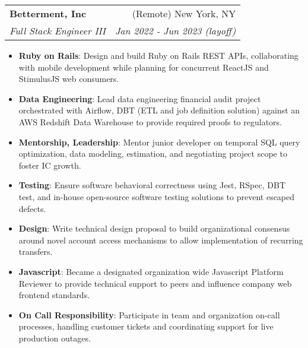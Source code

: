 \documentclass[letterpaper,11pt]{article}
\makeatletter
\newcommand{\resumeItem}[2]{
  \item\small{
    \textbf{#1}{: #2 \vspace{-2pt}}
  }
}
\newcommand{\resumeSubheading}[4]{
  \vspace{-1pt}\item
    \begin{tabular*}{0.97\textwidth}{l@{\extracolsep{\fill}}r}
      \textbf{#1} & #2 \\
      \textit{\small#3} & \textit{\small #4} \\
    \end{tabular*}\vspace{-5pt}
}
\newcommand{\resumeItemListStart}{\begin{itemize}}
\newcommand{\resumeItemListEnd}{\end{itemize}\vspace{-5pt}}
\makeatother
\begin{document}
    \resumeSubheading
      {Betterment, Inc}{(Remote) New York, NY}
      {Full Stack Engineer III}{Jan 2022 - Jun 2023 (layoff)}
      \resumeItemListStart
        \resumeItem{Ruby on Rails}
          {Design and build Ruby on Rails REST APIs, collaborating with mobile development while planning for concurrent ReactJS and StimulusJS web consumers.}
        \resumeItem{Data Engineering}
          {Lead data engineering financial audit project orchestrated with Airflow, DBT (ETL and job definition solution) against an AWS Redshift Data Warehouse to provide required proofs to regulators.}
        \resumeItem{Mentorship, Leadership}
          {Mentor junior developer on temporal SQL query optimization, data modeling, estimation, and negotiating project scope to foster IC growth.}
        \resumeItem{Testing}
          {Ensure software behavioral correctness using Jest, RSpec, DBT test, and in-house open-source software testing solutions to prevent escaped defects.}
        \resumeItem{Design}
          {Write technical design proposal to build organizational consensus around novel account access mechanisms to allow implementation of recurring transfers.}
        \resumeItem{Javascript}
          {Became a designated organization wide Javascript Platform Reviewer to provide technical support to peers and influence company web frontend standards.}
        \resumeItem{On Call Responsibility}
          {Participate in team and organization on-call processes, handling customer tickets and coordinating support for live production outages.}
      \resumeItemListEnd
\end{document}
